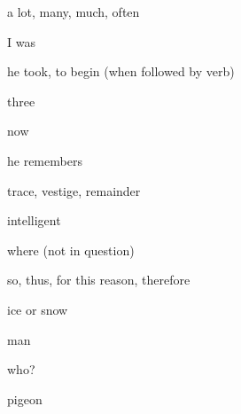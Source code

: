 \begin{flashcard}{\LARGE a lot, many, much, often}
\LARGE {}
\end{flashcard}
\begin{flashcard}{\LARGE I was}
\LARGE {}
\end{flashcard}
\begin{flashcard}{\LARGE he took, to begin (when followed by verb)}
\LARGE {}
\end{flashcard}
\begin{flashcard}{\LARGE three}
\LARGE {}
\end{flashcard}
\begin{flashcard}{\LARGE now}
\LARGE {}
\end{flashcard}
\begin{flashcard}{\LARGE he remembers}
\LARGE {}
\end{flashcard}
\begin{flashcard}{\LARGE trace, vestige, remainder}
\LARGE {}
\end{flashcard}
\begin{flashcard}{\LARGE intelligent}
\LARGE {}
\end{flashcard}
\begin{flashcard}{\LARGE where (not in question)}
\LARGE {}
\end{flashcard}
\begin{flashcard}{\LARGE so, thus, for this reason, therefore}
\LARGE {}
\end{flashcard}
\begin{flashcard}{\LARGE ice or snow}
\LARGE {}
\end{flashcard}
\begin{flashcard}{\LARGE man}
\LARGE {}
\end{flashcard}
\begin{flashcard}{\LARGE who?}
\LARGE {}
\end{flashcard}
\begin{flashcard}{\LARGE pigeon}
\LARGE {}
\end{flashcard}
